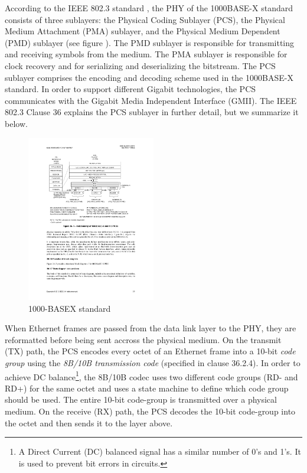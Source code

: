 \documentclass[conference]{IEEEtran}
\begin{document}
According to the IEEE 802.3 standard \cite{ieeestandard}, the PHY of the 1000BASE-X standard consists of three sublayers: the Physical Coding Sublayer (PCS), the Physical Medium Attachment (PMA) sublayer, and the Physical Medium Dependent (PMD) sublayer (see figure \cite{fig:archi}). The PMD sublayer is responsible for transmitting and receiving symbols from the medium. The PMA sublayer is responsible for clock recovery and for serializing and deserializing the bitstream. The PCS sublayer comprises the encoding and decoding scheme used in the 1000BASE-X standard. In order to support different Gigabit technologies, the PCS communicates with the Gigabit Media Independent Interface (GMII). The IEEE 802.3 Clause 36 explains the PCS sublayer in further detail, but we summarize it below.

\begin{figure}[t]
  \centering
  \includegraphics[width=0.5\textwidth]{images/archi.pdf}
  \caption{1000-BASEX standard}
  \label{fig:archi}
\end{figure}

When Ethernet frames are passed from the data link layer to the PHY, they are reformatted before being sent accross the physical medium. On the transmit (TX) path, the PCS encodes every octet of an Ethernet frame into a 10-bit \emph{code group} using the \emph{8B/10B transmission code} (specified in clause 36.2.4). In order to achieve DC balance\footnote{A Direct Current (DC) balanced signal has a similar number of 0's and 1's. It is used to prevent bit errors in circuits.}, the 8B/10B codec uses two different code groups (RD- and RD+) for the same octet and uses a state machine to define which code group should be used. The entire 10-bit code-group is transmitted over a physical medium. On the receive (RX) path, the PCS decodes the 10-bit code-group into the octet and then sends it to the layer above.
\end{document}
